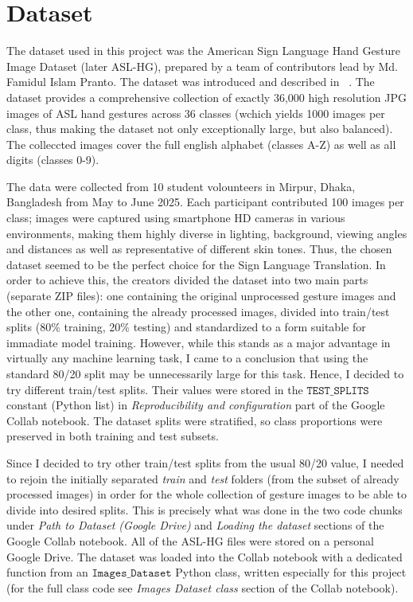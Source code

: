 \documentclass{article}
\newcommand{\code}[1]{\texttt{#1}} %
\begin{document}
\section{Dataset}
\label{sec:3}
The dataset used in this project was the American Sign Language Hand Gesture Image Dataset (later ASL-HG), prepared by a team of contributors lead by 
Md. Famidul Islam Pranto. The dataset was introduced and described in ~\citep{Pranto2026}. The dataset provides a comprehensive collection of exactly 
36,000 high resolution JPG images of ASL hand gestures across 36 classes (wchich yields 1000 images per class, thus making the dataset not only exceptionally
large, but also balanced). The colleccted images cover the full english alphabet (classes A-Z) as well as all digits (classes 0-9).  

The data were collected from 10 student volounteers in Mirpur, Dhaka, Bangladesh from May to June 2025. Each participant contributed 100 images per class; 
images were captured using smartphone HD cameras in various environments, making them highly diverse in lighting, background, viewing angles and distances 
as well as representative of different skin tones. Thus, the chosen dataset seemed to be the perfect choice for the Sign Language Translation.
In order to achieve this, the creators divided the dataset into two main parts (separate ZIP files): one containing the original unprocessed gesture images 
and the other one, containing the already processed images, divided into train/test splits (80\% training, 20\% testing) and standardized to a form suitable 
for immadiate model training. However, while this stands as a major advantage in virtually any machine learning task, I came to a conclusion that using the 
standard 80/20 split may be unnecessarily large for this task. Hence, I decided to try different train/test splits. Their values were stored in the 
$\code{TEST\_SPLITS}$ constant (Python list) in \textit{Reproducibility and configuration} part of the Google Collab notebook. The dataset splits 
were stratified, so class proportions were preserved in both training and test subsets.  

Since I decided to try other train/test splits from the usual 80/20 value, I needed to rejoin the initially separated \textit{train} and \textit{test} folders 
(from the subset of already processed images) in order for the whole collection of gesture images to be able to divide into desired splits. This is precisely what 
was done in the two code chunks under \textit{Path to Dataset (Google Drive)} and \textit{Loading the dataset} sections of the Google Collab notebook. All of 
the ASL-HG files were stored on a personal Google Drive. The dataset was loaded into the Collab notebook with a dedicated function from an $\code{Images\_Dataset}$
Python class, written especially for this project (for the full class code see \textit{Images Dataset class} section of the Collab notebook).  
\end{document}
